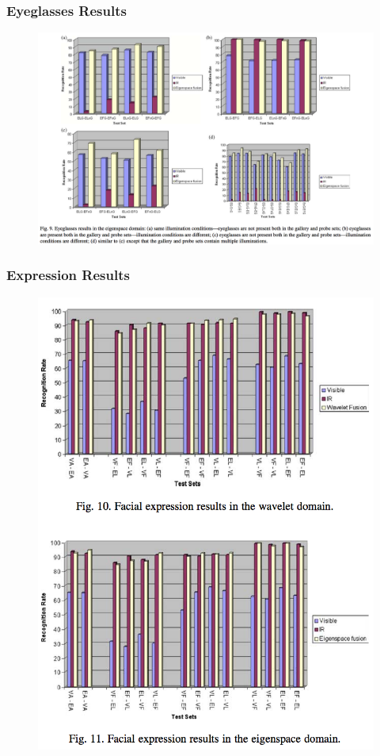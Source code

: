 \documentclass{beamer}
\begin{document}
\begin{frame}
\frametitle{Eyeglasses Results}
\begin{figure}
\includegraphics[width=\textwidth]{eyeglassesresults2}
\end{figure}
\end{frame}

\begin{frame}
\frametitle{Expression Results}
\begin{figure}
\includegraphics[height=0.8\textheight]{expressionresults}
\end{figure}
\end{frame}
\end{document}
